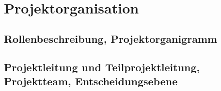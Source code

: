 
\section{Projektorganisation}

\subsection{Rollenbeschreibung, Projektorganigramm}

\subsection{Projektleitung und Teilprojektleitung, Projektteam, Entscheidungsebene}